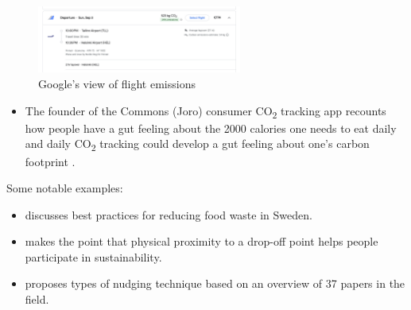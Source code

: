 \documentclass[
  letterpaper,
  DIV=11,
  numbers=noendperiod]{scrartcl}
\providecommand{\tightlist}{%
  \setlength{\itemsep}{0pt}\setlength{\parskip}{0pt}}\usepackage{longtable,booktabs,array}
\begin{document}
\begin{figure}[H]

{\centering \includegraphics[width=0.6\textwidth,height=\textheight]{./images/flight-emissions.png}

}

\caption{Google's view of flight emissions}

\end{figure}%

\begin{itemize}
\tightlist
\item
  The founder of the Commons (Joro) consumer CO\textsubscript{2}
  tracking app recounts how people have a gut feeling about the 2000
  calories one needs to eat daily and daily CO\textsubscript{2} tracking
  could develop a gut feeling about one's carbon footprint
  \citep{jasonjacobsEpisodeSanchaliPal2019}.
\end{itemize}

Some notable examples:

\begin{itemize}
\tightlist
\item
  \citet{ERIKSSON2023229} discusses best practices for reducing food
  waste in Sweden.
\item
  \citet{ACUTI2023122151} makes the point that physical proximity to a
  drop-off point helps people participate in sustainability.
\item
  \citet{WEE2021100364} proposes types of nudging technique based on an
  overview of 37 papers in the field.
\end{itemize}
\end{document}
